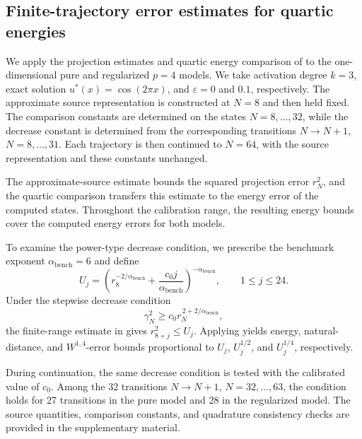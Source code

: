 \subsection{Finite-trajectory error estimates for quartic energies}
\label{sec:finite-trajectory-numerics}
\label{sec:fractional-innovation-p4}

We apply the projection estimates and quartic energy comparison of  to the one-dimensional pure and regularized \(p=4\) models. We take activation degree \(k=3\), exact solution \(u^*(x)=\cos(2\pi x)\), and \(\varepsilon=0\) and \(0.1\), respectively. The approximate source representation is constructed at \(N=8\) and then held fixed. The comparison constants are determined on the states \(N=8,\ldots,32\), while the decrease constant is determined from the corresponding transitions \(N\to N+1\), \(N=8,\ldots,31\). Each trajectory is then continued to \(N=64\), with the source representation and these constants unchanged.

The approximate-source estimate bounds the squared projection error \(r_N^2\), and the quartic comparison transfers this estimate to the energy error of the computed states. Throughout the calibration range, the resulting energy bounds cover the computed energy errors for both models.

To examine the power-type decrease condition, we prescribe the benchmark exponent \(\alpha_{\mathrm{bench}}=6\) and define
\[
U_j=
\left(
r_8^{-2/\alpha_{\mathrm{bench}}}
+\frac{c_0j}{\alpha_{\mathrm{bench}}}
\right)^{-\alpha_{\mathrm{bench}}},
\qquad 1\le j\le24.
\]
Under the stepwise decrease condition
\[
\gamma_N^2\ge
c_0r_N^{\,2+2/\alpha_{\mathrm{bench}}},
\]
the finite-range estimate in  gives \(r_{8+j}^2\le U_j\). Applying  yields energy, natural-distance, and \(W^{1,4}\)-error bounds proportional to \(U_j\), \(U_j^{1/2}\), and \(U_j^{1/4}\), respectively.

During continuation, the same decrease condition is tested with the calibrated value of \(c_0\). Among the 32 transitions \(N\to N+1\), \(N=32,\ldots,63\), the condition holds for 27 transitions in the pure model and 28 in the regularized model. The source quantities, comparison constants, and quadrature consistency checks are provided in the supplementary material.
